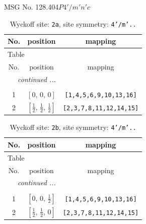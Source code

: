 \documentclass[fleqn,8pt]{jsarticle}
\begin{document}
\setcounter{MaxMatrixCols}{32}

\renewcommand{\tablename}{Table~}
\renewcommand{\figurename}{Figure~}
\begin{center}
\LARGE
MSG No. 128.404\quad$P4'/m'n'c$
\end{center}
\renewcommand{\arraystretch}{1.2}
\begin{longtable}{ccc}
\caption{Wyckoff site: {\tt 2a}, site symmetry: {\tt 4'/m'..}}
 \\
 \hline \hline
No. & position & mapping \\ \hline \endfirsthead

\multicolumn{2}{l}{\tablename\ \thetable{}} \\
 \hline \hline
No. & position & mapping \\ \hline \endhead

 \hline \hline
\multicolumn{2}{r}{\footnotesize\it continued ...} \\ \endfoot

 \hline \hline
\multicolumn{2}{r}{} \\ \endlastfoot

1 & $\left[ 0,\, 0,\, 0 \right]$ & {\tt [1,4,5,6,9,10,13,16]} \\ \hline
2 & $\left[ \frac{1}{2},\, \frac{1}{2},\, \frac{1}{2} \right]$ & {\tt [2,3,7,8,11,12,14,15]} \\
\end{longtable}
\renewcommand{\arraystretch}{1.2}
\begin{longtable}{ccc}
\caption{Wyckoff site: {\tt 2b}, site symmetry: {\tt 4'/m'..}}
 \\
 \hline \hline
No. & position & mapping \\ \hline \endfirsthead

\multicolumn{2}{l}{\tablename\ \thetable{}} \\
 \hline \hline
No. & position & mapping \\ \hline \endhead

 \hline \hline
\multicolumn{2}{r}{\footnotesize\it continued ...} \\ \endfoot

 \hline \hline
\multicolumn{2}{r}{} \\ \endlastfoot

1 & $\left[ 0,\, 0,\, \frac{1}{2} \right]$ & {\tt [1,4,5,6,9,10,13,16]} \\ \hline
2 & $\left[ \frac{1}{2},\, \frac{1}{2},\, 0 \right]$ & {\tt [2,3,7,8,11,12,14,15]} \\
\end{longtable}
\end{document}
